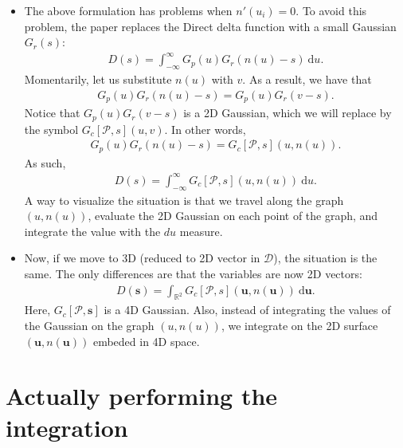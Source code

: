 \documentclass[10pt]{article}
\newcommand{\dee}{\mathrm{d}}
\newcommand{\ve}[1]{\mathbf{#1}}
\newcommand{\Real}{\mathbb{R}}
\begin{document}
\begin{itemize}
  	\item The above formulation has problems when $n'(u_i) = 0$.  To avoid this problem, the paper replaces the Direct delta function with a small Gaussian $G_r(s)$:
  	\begin{align*}
  		D(s) = \int_{-\infty}^\infty G_p(u) G_r(n(u) - s)\ \dee u.
  	\end{align*}
  	Momentarily, let us substitute $n(u)$ with $v$.  As a result, we have that
  	\begin{align*}
  		G_p(u) G_r(n(u)-s) = G_p(u)G_r(v-s).
  	\end{align*}
  	Notice that $G_p(u)G_r(v-s)$ is a 2D Gaussian, which we will replace by the symbol $G_c[\mathcal{P},s](u,v)$.  In other words,
  	\begin{align*}
  		G_p(u) G_r(n(u)-s) = G_c[\mathcal{P},s](u, n(u)).
  	\end{align*}
  	As such,
  	\begin{align*}
  		D(s) = \int_{-\infty}^{\infty} G_c[\mathcal{P},s](u, n(u))\ \dee u.
  	\end{align*}
  	A way to visualize the situation is that we travel along the graph $(u,n(u))$, evaluate the 2D Gaussian on each point of the graph, and integrate the value with the $du$ measure.

  	\item Now, if we move to 3D (reduced to 2D vector in $\mathcal{D}$), the situation is the same.  The only differences are that the variables are now 2D vectors:
  	\begin{align*}
  		D(\ve{s}) = \int_{\Real^2} G_c[\mathcal{P},s](\ve{u}, n(\ve{u}))\ \dee \ve{u}.
  	\end{align*}
  	Here, $G_c[\mathcal{P},\ve{s}]$ is a 4D Gaussian.  Also, instead of integrating the values of the Gaussian on the graph $(u,n(u))$, we integrate on the 2D surface $(\ve{u}, n(\ve{u}))$ embeded in 4D space.
  \end{itemize}

  \section{Actually performing the integration}
  
\end{document}
